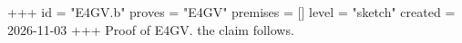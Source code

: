 +++
id = "E4GV.b"
proves = "E4GV"
premises = []
level = "sketch"
created = 2026-11-03
+++
Proof of E4GV. the claim follows.
